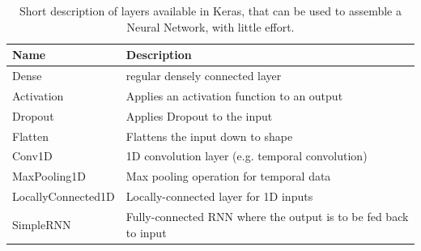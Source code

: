 \begin{center}
	\begin{table}[h!]
		\begin{tabular}{| l | l |}
			\hline
			\bfseries Name & \bfseries Description \\
			\hline
			Dense & regular densely connected layer \\
			\hline
			Activation & Applies an activation function to an output \\
			\hline
			Dropout & Applies Dropout to the input \\
			\hline
			Flatten & Flattens the input down to shape \\
			\hline
			Conv1D & 1D convolution layer (e.g. temporal convolution)  \\
			\hline
			MaxPooling1D & Max pooling operation for temporal data \\
			\hline
			LocallyConnected1D & Locally-connected layer for 1D inputs \\
			\hline
			SimpleRNN & Fully-connected RNN where the output is to be fed back to input \\
			\hline
			
		\end{tabular}
		\caption{Short description of layers available in Keras, that can be used to assemble a Neural Network, with little effort.}
		\label{tab:methodology_tensorflow_alternativesToTensorflow_kerasLayers}
	\end{table}
\end{center}

\filbreak
